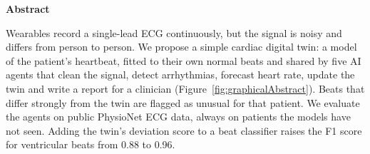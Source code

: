 \begin{center}
\large\textbf{Abstract}
\end{center}

\noindent Wearables record a single-lead ECG continuously, but the signal is noisy and differs from person to person. We propose a simple cardiac digital twin: a model of the patient's heartbeat, fitted to their own normal beats and shared by five AI agents that clean the signal, detect arrhythmias, forecast heart rate, update the twin and write a report for a clinician (Figure~\ref{fig:graphicalAbstract}). Beats that differ strongly from the twin are flagged as unusual for that patient. We evaluate the agents on public PhysioNet ECG data, always on patients the models have not seen. Adding the twin's deviation score to a beat classifier raises the F1 score for ventricular beats from 0.88 to 0.96.
